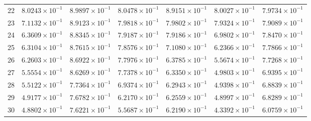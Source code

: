 \begin{table}[H]
\begin{tabular}{@{}rrrrrrr@{}}
22 & $8.0243\times10^{-1}$ & $8.9897\times10^{-1}$ & $8.0478\times10^{-1}$ & $8.9151\times10^{-1}$ & $8.0027\times10^{-1}$ & $7.9734\times10^{-1}$\\
23 & $7.1132\times10^{-1}$ & $8.9123\times10^{-1}$ & $7.9818\times10^{-1}$ & $7.9802\times10^{-1}$ & $7.9324\times10^{-1}$ & $7.9089\times10^{-1}$\\
24 & $6.3609\times10^{-1}$ & $8.8345\times10^{-1}$ & $7.9187\times10^{-1}$ & $7.9186\times10^{-1}$ & $6.9802\times10^{-1}$ & $7.8470\times10^{-1}$\\
25 & $6.3104\times10^{-1}$ & $8.7615\times10^{-1}$ & $7.8576\times10^{-1}$ & $7.1080\times10^{-1}$ & $6.2366\times10^{-1}$ & $7.7866\times10^{-1}$\\
26 & $6.2603\times10^{-1}$ & $8.6922\times10^{-1}$ & $7.7976\times10^{-1}$ & $6.3785\times10^{-1}$ & $5.5674\times10^{-1}$ & $7.7268\times10^{-1}$\\
27 & $5.5554\times10^{-1}$ & $8.6269\times10^{-1}$ & $7.7378\times10^{-1}$ & $6.3350\times10^{-1}$ & $4.9803\times10^{-1}$ & $6.9395\times10^{-1}$\\
28 & $5.5122\times10^{-1}$ & $7.7364\times10^{-1}$ & $6.9374\times10^{-1}$ & $6.2943\times10^{-1}$ & $4.9398\times10^{-1}$ & $6.8839\times10^{-1}$\\
29 & $4.9177\times10^{-1}$ & $7.6782\times10^{-1}$ & $6.2170\times10^{-1}$ & $6.2559\times10^{-1}$ & $4.8997\times10^{-1}$ & $6.8289\times10^{-1}$\\
30 & $4.8802\times10^{-1}$ & $7.6221\times10^{-1}$ & $5.5687\times10^{-1}$ & $6.2190\times10^{-1}$ & $4.3392\times10^{-1}$ & $6.0759\times10^{-1}$\\
\bottomrule
\end{tabular}
\end{table}

